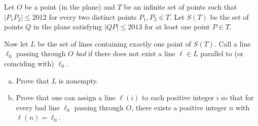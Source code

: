 Let $O$ be a point (in the plane) and $T$ be an infinite set of points such that $|P_1P_2| \le 2012$ for every two distinct points $P_1,P_2\in T$. Let $S(T)$ be the set of points $Q$ in the plane satisfying $|QP| \le 2013$ for at least one point $P\in T$.

Now let $L$ be the set of lines containing exactly one point of $S(T)$. Call a line $\ell_0$ passing through $O$ \textit{bad} if there does not exist a line $\ell\in L$ parallel to (or coinciding with) $\ell_0$.

\begin{enumerate}[(a)]
\item Prove that $L$ is nonempty.
\item Prove that one can assign a line $\ell(i)$ to each positive integer $i$ so that for every bad line $\ell_0$ passing through $O$, there exists a positive integer $n$ with $\ell(n) = \ell_0$.
\end{enumerate}

